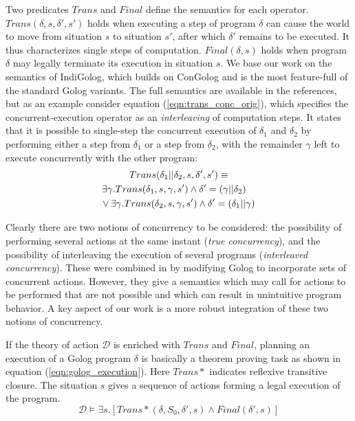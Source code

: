 \documentclass[times, 10pt, twocolumn]{article}
\begin{document}
Two predicates $Trans$ and $Final$ define the semantics for each
operator. $Trans(\delta,s,\delta',s')$ holds when executing a step
of program $\delta$ can cause the world to move from situation $s$
to situation $s'$, after which $\delta'$ remains to be executed.
It thus characterizes single steps of computation. $Final(\delta,s)$
holds when program $\delta$ may legally terminate its execution in
situation $s$. We base our work on the semantics of IndiGolog, which
builds on ConGolog and is the most feature-full of the standard Golog
variants. The full semantics are available in the references, but
as an example consider equation (\ref{eqn:trans_conc_orig}), which
specifies the concurrent-execution operator as an \emph{interleaving}
of computation steps. It states that it is possible to single-step
the concurrent execution of $\delta_{1}$ and $\delta_{2}$ by performing
either a step from $\delta_{1}$ or a step from $\delta_{2}$, with
the remainder $\gamma$ left to execute concurrently with the other
program:
\begin{multline}
Trans(\delta_{1}||\delta_{2},s,\delta',s')\equiv\\
\shoveright{\exists\gamma.Trans(\delta_{1},s,\gamma,s')\wedge\delta'=(\gamma||\delta_{2})}\\
\vee\,\exists\gamma.Trans(\delta_{2},s,\gamma,s')\wedge\delta'=(\delta_{1}||\gamma)\label{eqn:trans_conc_orig}
\end{multline}

Clearly there are two notions of concurrency to be considered: the
possibility of performing several actions at the same instant (\emph{true
concurrency}), and the possibility of interleaving the execution of
several programs (\emph{interleaved concurrency}). These were combined
in \cite{pinto99tcongolog} by modifying Golog to incorporate sets
of concurrent actions. However, they give a semantics which may call
for actions to be performed that are not possible and which can result
in unintuitive program behavior. A key aspect of our work is a more
robust integration of these two notions of concurrency.

If the theory of action $\mathcal{D}$ is enriched with $Trans$ and
$Final$, planning an execution of a Golog program $\delta$ is basically
a theorem proving task as shown in equation (\ref{eqn:golog_execution}).
Here $Trans*$ indicates reflexive transitive closure. The situation
$s$ gives a sequence of actions forming a legal execution of the
program.
\begin{equation}
\mathcal{D}\models\exists s.\left[Trans*(\delta,S_{0},\delta',s)\wedge Final(\delta',s)\right]\label{eqn:golog_execution}
\end{equation}
\end{document}
